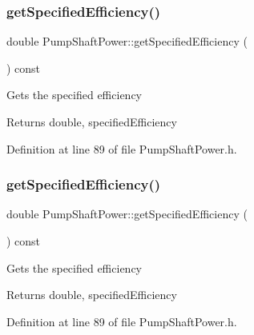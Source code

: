 \subsubsection{\texorpdfstring{get\+Specified\+Efficiency()}{getSpecifiedEfficiency()}\hspace{0.1cm}{\footnotesize\ttfamily [2/3]}}
{\footnotesize\ttfamily double Pump\+Shaft\+Power\+::get\+Specified\+Efficiency (\begin{DoxyParamCaption}{ }\end{DoxyParamCaption}) const\hspace{0.3cm}{\ttfamily [inline]}}

Gets the specified efficiency \begin{DoxyReturn}{Returns}
double, specified\+Efficiency 
\end{DoxyReturn}


Definition at line 89 of file Pump\+Shaft\+Power.\+h.

\mbox{\label{class_pump_shaft_power_a93c70d2b6f70d6d98b97859fc095193a}} 
\subsubsection{\texorpdfstring{get\+Specified\+Efficiency()}{getSpecifiedEfficiency()}\hspace{0.1cm}{\footnotesize\ttfamily [3/3]}}
{\footnotesize\ttfamily double Pump\+Shaft\+Power\+::get\+Specified\+Efficiency (\begin{DoxyParamCaption}{ }\end{DoxyParamCaption}) const\hspace{0.3cm}{\ttfamily [inline]}}

Gets the specified efficiency \begin{DoxyReturn}{Returns}
double, specified\+Efficiency 
\end{DoxyReturn}


Definition at line 89 of file Pump\+Shaft\+Power.\+h.

\mbox{\label{class_pump_shaft_power_a5cbcf0acd63ae4a2ffe9a5c13ba73a3a}} 
